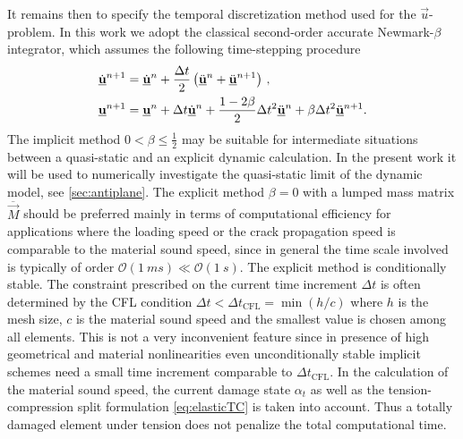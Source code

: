 It remains then to specify the temporal discretization method used for the $\vec{u}$-problem. In this work we adopt the classical second-order accurate Newmark-$\beta$ integrator, which assumes the following time-stepping procedure
\begin{align}
\dot{\uvec}^{n+1} &= \dot{\uvec}^n+\frac{\Delta t}{2}\left(\ddot{\uvec}^n+\ddot{\uvec}^{n+1}\right)\,, \label{eq:un2} \\
\uvec^{n+1} &= \uvec^n+\Delta t\dot{\uvec}^n+\frac{1-2\beta}{2}\Delta t^2\ddot{\uvec}^n+\beta\Delta t^2\ddot{\uvec}^{n+1}. \label{eq:un1}
\end{align}
The implicit method $0<\beta\leq\frac{1}{2}$ may be suitable for intermediate situations between a quasi-static and an explicit dynamic calculation. In the present work it will be used to numerically investigate the quasi-static limit of the dynamic model, see \cref{sec:antiplane}. The explicit method $\beta=0$ with a lumped mass matrix $\overline{\vec{M}}$ should be preferred mainly in terms of computational efficiency for applications where the loading speed or the crack propagation speed is comparable to the material sound speed, since in general the time scale involved is typically of order $\mathcal{O}(\SI{1}{ms})\ll\mathcal{O}(\SI{1}{s})$. The explicit method is conditionally stable. The constraint prescribed on the current time increment $\Delta t$ is often determined by the CFL condition $\Delta t<\Delta t_\mathrm{CFL}=\min(h/c)$ where $h$ is the mesh size, $c$ is the material sound speed and the smallest value is chosen among all elements. This is not a very inconvenient feature since in presence of high geometrical and material nonlinearities even unconditionally stable implicit schemes need a small time increment comparable to $\Delta t_\mathrm{CFL}$. In the calculation of the material sound speed, the current damage state $\alpha_t$ as well as the tension-compression split formulation \eqref{eq:elasticTC} is taken into account. Thus a totally damaged element under tension does not penalize the total computational time.

